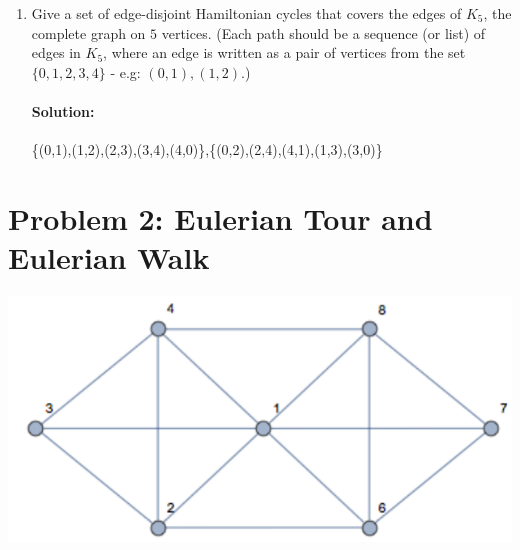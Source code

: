 \documentclass[11pt, notitlepage]{report}
\newcommand{\Question}[1]{\newpage\section{#1}}
\newenvironment{solution}{\paragraph{Solution:}}{\hfill}
\begin{document}
\begin{enumerate}[label=(\alph*)]
\begin{solution}
\end{solution}

\item
Give a set of edge-disjoint Hamiltonian cycles that covers the edges of $K_5$, the complete
graph on $5$ vertices.
(Each path should be a sequence (or list) of edges in $K_5$, where an edge is written as a pair of vertices from the set $\{0, 1, 2, 3, 4\}$ - e.g: $(0, 1), (1, 2)$.)
\begin{solution}
	\{(0,1),(1,2),(2,3),(3,4),(4,0)\},\{(0,2),(2,4),(4,1),(1,3),(3,0)\}
\end{solution}

\end{enumerate}


\Question{Problem 2: Eulerian Tour and Eulerian Walk}

\begin{center}
\includegraphics{eulerianquestiongraph}	
\end{center}
\end{document}

